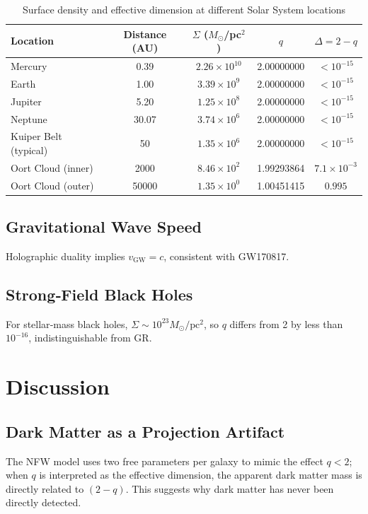 \documentclass[12pt,a4paper]{article}
\begin{document}
\begin{table}[htbp]
\centering
\caption{Surface density and effective dimension at different Solar System locations}
\label{tab:solar}
\begin{tabular}{lcccc}
\toprule
\textbf{Location} & \textbf{Distance (AU)} & $\Sigma$ ($M_\odot$/pc$^2$) & $q$ & $\Delta = 2-q$ \\
\midrule
Mercury & 0.39 & $2.26\times10^{10}$ & 2.00000000 & $<10^{-15}$ \\
Earth & 1.00 & $3.39\times10^{9}$ & 2.00000000 & $<10^{-15}$ \\
Jupiter & 5.20 & $1.25\times10^{8}$ & 2.00000000 & $<10^{-15}$ \\
Neptune & 30.07 & $3.74\times10^{6}$ & 2.00000000 & $<10^{-15}$ \\
Kuiper Belt (typical) & 50 & $1.35\times10^{6}$ & 2.00000000 & $<10^{-15}$ \\
Oort Cloud (inner) & 2000 & $8.46\times10^{2}$ & 1.99293864 & $7.1\times10^{-3}$ \\
Oort Cloud (outer) & 50000 & $1.35\times10^{0}$ & 1.00451415 & $0.995$ \\
\bottomrule
\end{tabular}
\end{table}

\subsection{Gravitational Wave Speed}
Holographic duality implies $v_{\text{GW}}=c$, consistent with GW170817.

\subsection{Strong‑Field Black Holes}
For stellar‑mass black holes, $\Sigma\sim 10^{23}M_\odot/\text{pc}^2$, so $q$ differs from 2 by less than $10^{-16}$, indistinguishable from GR.

\section{Discussion}
\subsection{Dark Matter as a Projection Artifact}
The NFW model uses two free parameters per galaxy to mimic the effect $q<2$; when $q$ is interpreted as the effective dimension, the apparent dark matter mass is directly related to $(2-q)$. This suggests why dark matter has never been directly detected.
\end{document}

